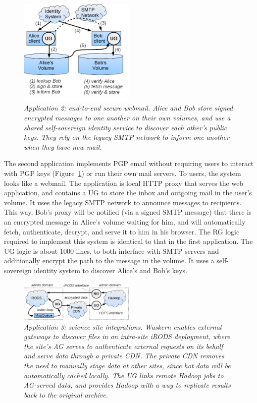 \begin{figure}[t!]
\centering
\includegraphics[width=0.5\textwidth]{figures/secure-mail}
\caption{\it Application 2: end-to-end secure webmail. Alice and Bob store
   signed encrypted messages to one another on their own volumes, and use a
   shared self-sovereign identity service to discover each other's public keys.
   They rely on the legacy SMTP network to inform one another when they have new
   mail.}
\label{fig:secure-mail}
\end{figure}

The second application implements PGP email without requiring users to interact
with PGP keys (Figure~\ref{fig:secure-mail}) or run their own mail servers.
To users, the system looks like a webmail. The application is
local HTTP proxy that serves the web application, and contains a UG to store the
inbox and outgoing mail in the user's volume. It uses the legacy SMTP
network to announce messages to recipients. This way, Bob's proxy will be
notified (via a signed SMTP message) that there is an encrypted message in
Alice's volume waiting for him, and will automatically fetch, authenticate,
decrypt, and serve it to him in his browser. The RG logic required to implement
this system is identical to that in the first application. The UG logic is about
1000 lines, to both interface with SMTP servers and additionally encrypt the
path to the message in the volume. It uses a self-sovereign identity system to discover Alice's and
Bob's keys.

\begin{figure}[t!]
\centering
\includegraphics[width=0.5\textwidth]{figures/irods-hadoop}
\caption{\it Application 3: science site integrations.  Waskern enables external
   gateways to discover files in an intra-site iRODS deployment, where the
   site's AG serves to authenticate external requests on its behalf and serve
   data through a private CDN.  The private CDN removes the need to manually
   stage data at other sites, since hot data will be automatically cached
   locally.  The UG links remote Hadoop jobs to AG-served data, and provides
   Hadoop with a way to replicate results back to the original archive.}
\label{fig:irods-hadoop}
\end{figure}


